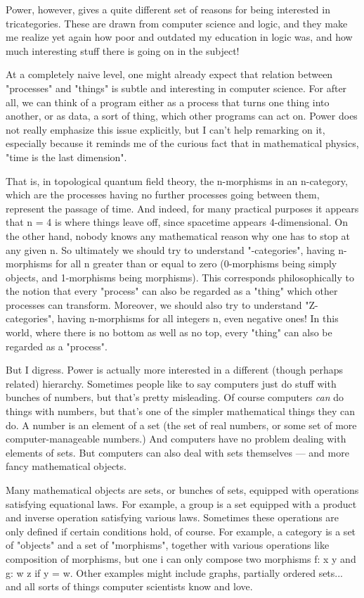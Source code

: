 Power, however, gives a quite different set of reasons for being
interested in tricategories.  These are drawn from computer science
and logic, and they make me realize yet again how poor and outdated
my education in logic was, and how much interesting stuff there is
going on in the subject! 

At a completely naive level, one might already expect that
relation between "processes" and "things" is subtle and interesting
in computer science.  For after all, we can think of a program
either as a process that turns one thing into another, or as
data, a sort of thing, which other programs can act on.  Power does
not really emphasize this issue explicitly, but I can't help
remarking on it, especially because it reminds me of the curious fact 
that in mathematical physics, "time is the last dimension".  

That is, in topological quantum field theory, the n-morphisms in an n-category, 
which are the processes having no further processes going between them, 
represent the passage of time.  And indeed, for many practical purposes 
it appears that n = 4 is where things leave off, since spacetime appears 
4-dimensional.  On the other hand, nobody knows any mathematical reason why 
one has to stop at any given n.  So ultimately we should try to 
understand "\omega -categories", having n-morphisms for all n greater than or
equal to zero (0-morphisms being simply objects, and 1-morphisms
being morphisms).  This corresponds philosophically to the notion
that every "process" can also be regarded as a "thing" which
other processes can transform.  Moreover, we should also try to understand 
"Z-categories", having n-morphisms for all integers n, even negative ones!  
In this world, where there is no bottom as well as no top, every "thing" 
can also be regarded as a "process".  

But I digress.  Power is actually more interested in a different
(though perhaps related) hierarchy.   Sometimes people like to 
say computers just do stuff with bunches of numbers, but that's 
pretty misleading.  Of course computers \emph{can} do things with numbers,
but that's one of the simpler mathematical things they can do.
A number is an element of a set (the set of real numbers, or some
set of more computer-manageable numbers.)   And computers
have no problem dealing with elements of sets.  But computers can also 
deal with sets themselves --- and more fancy mathematical
objects.

Many mathematical objects are sets, or bunches of sets, equipped with 
operations satisfying equational laws.  For example, a group is a set equipped 
with a product and inverse operation satisfying various laws.   Sometimes
these operations are only defined if certain conditions hold, of course.
For example, a category is a set of "objects" and a set of "morphisms",
together with various operations like composition of morphisms, but one i
can only compose two morphisms f: x \to  y and g: w \to  z if y = w.  
Other examples might include graphs, partially ordered sets... and all 
sorts of things computer scientists know and love.


